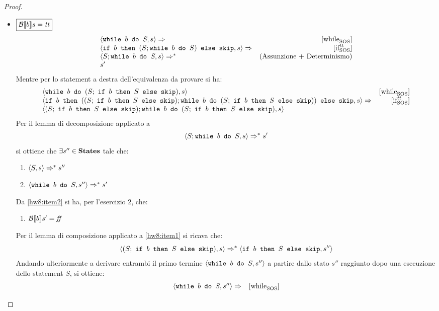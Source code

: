 \begin{proof}
\begin{itemize}
  \item $\boxed{\B{b} = \semtrue}$
  $$
  \begin{array}{lr}
  \confSs{\wbS{b}{S}}{s} \Rar{ }  & \whileSOS \\
  \confSs{\ifABC{b}{(S;\wbS{b}{S})}{\skipForFriends}}{s} \Rar{ } & \ifttSOS\\
  \confSs{S; \wbS{b}{S}}{s} \Rar{*} & (\text{Assunzione + Determinismo})\\
  s'
  \end{array}
  $$
  Mentre per lo statement a destra dell'equivalenza da provare si ha:
  $$
  \begin{array}{lr}
  \confSs{\wbS{b}{(S;\ \ifABC{b}{S}{\skipForFriends})}}{s} & \whileSOS \\
  \confSs{\ifABC{b}
            {((S;\ \ifABC{b}{S}{\skipForFriends});
              \wbS{b}{(S;\ \ifABC{b}{S}{\skipForFriends})})}
            {\skipForFriends}
         }{s} \Rar{ }& \ifttSOS \\
  \confSs{  (S;\ \ifABC{b}{S}{\skipForFriends});
            \wbS{b}{(S;\ \ifABC{b}{S}{\skipForFriends})}
         }{s}
  \end{array}
  $$
  Per il lemma di decomposizione applicato a
  \begin{equation}
  \langle{}S; \mbox{\normalfont{\texttt{while }}} b \textrm{\normalfont{\texttt{ do }}} S, s\rangle{} \Rightarrow^{*} s'
    \label{eq:hw8:imp}
  \end{equation}
  si ottiene che $\exists s'' \in \states$ tale che:
  \begin{enumerate}[label=(\alph*)]
    \item $\confSs{S}{s} \Rar{*} s''$
    \label{hw8:item1}
    \item $\confSs{\wbS{b}{S}}{s''} \Rar{*} s'$
    \label{hw8:item2}
  \end{enumerate}
  Da \ref{hw8:item2} si ha, per l'esercizio 2, che:
  \begin{enumerate}[label=(\Roman*)]
    \item $\B{b}' = \semfalse$
    \label{hw8:Bbs':ff}
  \end{enumerate}
  Per il lemma di composizione applicato a \ref{hw8:item1} si ricava che:
  $$
  \confSs{(S;\ \ifABC{b}{S}{\skipForFriends})}{s}
    \Rar{*}
  \confSs{\ifABC{b}{S}{\skipForFriends}}{s''}
  $$
  Andando ulteriormente a derivare entrambi il primo termine
  $\confSs{\wbS{b}{S}}{s''}$ a partire dallo stato $s''$ raggiunto dopo una
  esecuzione dello statement $S$, si ottiene:
  $$
  \begin{array}{lr}
  \confSs{\wbS{b}{S}}{s''} \Rar{ }  & \whileSOS \\

\end{array}$$
\end{itemize}
\end{proof}
